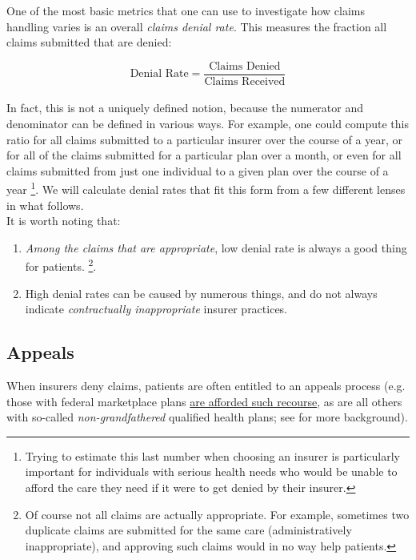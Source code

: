 \documentclass[12pt, a4paper,twoside]{report}
\theoremstyle{plain} %
\theoremstyle{definition} %
\theoremstyle{remark} %
\numberwithin{equation}{chapter}
\begin{document}
		\hspace{2em} One of the most basic metrics that one can use to investigate how claims handling varies is an overall \emph{claims denial rate}. This measures the fraction all claims submitted that are denied:
		
		\begin{equation*}
			\text{Denial Rate} = \dfrac{\text{Claims Denied}}{\text{Claims Received}}
		\end{equation*}
		\hfill\\
		In fact, this is not a uniquely defined notion, because the numerator and denominator can be defined in various ways. For example, one could compute this ratio for all claims submitted to a particular insurer over the course of a year, or for all of the claims submitted for a particular plan over a month, or even for all claims submitted from just one individual to a given plan over the course of a year \footnote{Trying to estimate this last number when choosing an insurer is particularly important for individuals with serious health needs who would be unable to afford the care they need if it were to get denied by their insurer.}. We will calculate denial rates that fit this form from a few different lenses in what follows.\\
		
		It is worth noting that:
		
		\begin{enumerate}
			\item \emph{Among the claims that are appropriate}, low denial rate is always a good thing for patients. \footnote{Of course not all claims are actually appropriate. For example, sometimes two duplicate claims are submitted for the same care (administratively inappropriate), and approving such claims would in no way help patients. }.
			\item High denial rates can be caused by numerous things, and do not always indicate \emph{contractually inappropriate} insurer practices.
		\end{enumerate}
		
		
		\subsection{Appeals}
		
		When insurers deny claims, patients are often entitled to an appeals process (e.g. those with federal marketplace plans \href{https://www.healthcare.gov/appeal-insurance-company-decision/appeals/}{are afforded such recourse}, as are all others with so-called \emph{non-grandfathered} qualified health plans; see \cite{pollitz2021} for more background).\\
		
\end{document}
